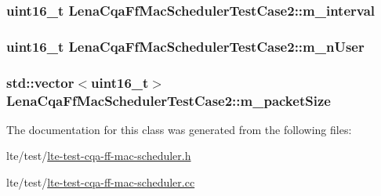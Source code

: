 \subsubsection[{\texorpdfstring{m\+\_\+interval}{m_interval}}]{\setlength{\rightskip}{0pt plus 5cm}uint16\+\_\+t Lena\+Cqa\+Ff\+Mac\+Scheduler\+Test\+Case2\+::m\+\_\+interval\hspace{0.3cm}{\ttfamily [private]}}\hypertarget{classLenaCqaFfMacSchedulerTestCase2_a682a0b8a7dee755e81395b515b0643e4}{}\label{classLenaCqaFfMacSchedulerTestCase2_a682a0b8a7dee755e81395b515b0643e4}
\subsubsection[{\texorpdfstring{m\+\_\+n\+User}{m_nUser}}]{\setlength{\rightskip}{0pt plus 5cm}uint16\+\_\+t Lena\+Cqa\+Ff\+Mac\+Scheduler\+Test\+Case2\+::m\+\_\+n\+User\hspace{0.3cm}{\ttfamily [private]}}\hypertarget{classLenaCqaFfMacSchedulerTestCase2_a335a7e080f06c9fed2a1b431389615f1}{}\label{classLenaCqaFfMacSchedulerTestCase2_a335a7e080f06c9fed2a1b431389615f1}
\subsubsection[{\texorpdfstring{m\+\_\+packet\+Size}{m_packetSize}}]{\setlength{\rightskip}{0pt plus 5cm}std\+::vector$<$uint16\+\_\+t$>$ Lena\+Cqa\+Ff\+Mac\+Scheduler\+Test\+Case2\+::m\+\_\+packet\+Size\hspace{0.3cm}{\ttfamily [private]}}\hypertarget{classLenaCqaFfMacSchedulerTestCase2_ad46ead6ee3f29ac4d167b294e9fd7a7c}{}\label{classLenaCqaFfMacSchedulerTestCase2_ad46ead6ee3f29ac4d167b294e9fd7a7c}


The documentation for this class was generated from the following files\+:\begin{DoxyCompactItemize}
\item 
lte/test/\hyperlink{lte-test-cqa-ff-mac-scheduler_8h}{lte-\/test-\/cqa-\/ff-\/mac-\/scheduler.\+h}\item 
lte/test/\hyperlink{lte-test-cqa-ff-mac-scheduler_8cc}{lte-\/test-\/cqa-\/ff-\/mac-\/scheduler.\+cc}\end{DoxyCompactItemize}
